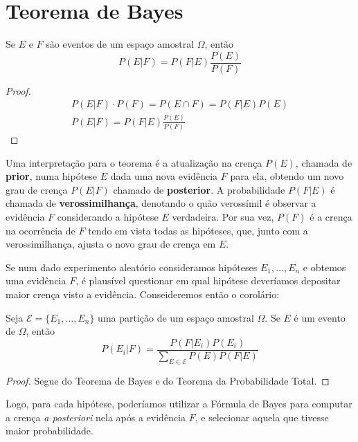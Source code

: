 \section{Teorema de Bayes}
\begin{thm:bayes}
Se $E$ e $F$ são eventos de um espaço amostral $\Omega$, então
\[
	P(E | F) = P(F | E) \frac{P(E)}{P(F)}
\]
\begin{proof}
	\begin{gather*}
		P(E | F) \cdot P(F) = P(E \cap F) = P(F | E) P(E)\\
		P(E | F) = P(F | E) \frac{P(E)}{P(F)}
	\end{gather*}
\end{proof}
\end{thm:bayes}

Uma interpretação para o teorema é a atualização na crença $P(E)$, chamada de
\textbf{prior}, numa hipótese $E$ dada uma nova evidência $F$ para ela, obtendo um novo
grau de crença $P(E|F)$ chamado de \textbf{posterior}. A probabilidade $P(F|E)$ é
chamada de \textbf{verossimilhança}, denotando o quão verossímil é observar a evidência $F$
considerando a hipótese $E$ verdadeira. Por sua vez, $P(F)$ é a crença na ocorrência
de $F$ tendo em vista todas as hipóteses, que, junto com a verossimilhança, ajusta
o novo grau de crença em $E$.

Se num dado experimento aleatório consideramos hipóteses $E_1, \ldots, E_n$ e obtemos
uma evidência $F$, é plausível questionar em qual hipótese deveríamos depositar maior
crença visto a evidência. Conseideremos então o corolário:

\begin{cor:formula de bayes}
Seja $\mathcal{E} = \{E_1, \ldots, E_n\}$ uma partição de um espaço amostral $\Omega$.
Se $E$ é um evento de $\Omega$, então
\[
	P(E_i | F) = \frac{P(F | E_i) P(E_i) }{\sum_{E \in \mathcal{E}} P(E) P(F | E)}
\]
\begin{proof}
	Segue do Teorema de Bayes e do Teorema da Probabilidade Total.
\end{proof}
\end{cor:formula de bayes}

Logo, para cada hipótese, poderíamos utilizar a Fórmula de Bayes para computar a crença
\textit{a posteriori} nela após a evidência $F$, e selecionar aquela que tivesse maior
probabilidade.

